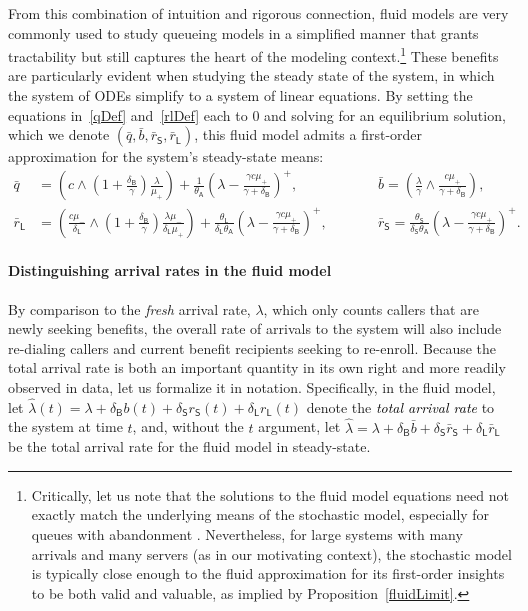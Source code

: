 \documentclass[manuscript,screen,authorversion]{acmart}
\newcommand{\rev}[1]{\textcolor{black}{#1}}
\begin{document}
From this combination of intuition and rigorous connection, fluid models are very commonly used to study queueing models in a simplified manner that grants tractability but still captures the heart of the modeling context.\footnote{Critically, let us note that the solutions to the fluid model equations need not exactly match the underlying means of the stochastic model, especially for queues with abandonment \citep[e.g.,][]{daw2019new}. Nevertheless, for large systems with many arrivals and many servers (as in our motivating context), the stochastic model is typically close enough to the fluid approximation for its first-order insights to be both valid and valuable, as implied by Proposition~\ref{fluidLimit}.} 
These benefits are particularly evident when studying the steady state of the system, in which the system of ODEs simplify to a system of linear equations.
By setting the equations in~\eqref{qDef} and~\eqref{rlDef} each to 0 and solving for an equilibrium solution, which we denote $(\bar q, \bar b, \bar r_\mathsf{S}, \bar r_\mathsf{L})$, this fluid model admits a first-order approximation for the system's steady-state means:
\begin{align}
\bar q
&=
\left(
c \wedge \left(1 + \frac{\delta_\mathsf{B}}{\gamma}\right)\frac{\lambda}{\mu_\mathsf{+}}
\right)
+
\frac{1}{\theta_\mathsf{A}}
\left(
\lambda - \frac{\gamma c \mu_{\mathsf{+}}}{\gamma + \delta_\mathsf{B}} 
\right)^+
,
\qquad
&&
\bar b 
=
\left(
\frac{\lambda}{\gamma}
\wedge
\frac{c\mu_{\mathsf{+}}}{\gamma + \delta_\mathsf{B}}
\right)
,
\\
\bar r_\mathsf{L}
&=
\left(
\frac{c\mu_{\mathsf{-}}}{\delta_\mathsf{L}}
\wedge
\left(
1 + \frac{\delta_\mathsf{B}}{\gamma}
\right)
\frac{\lambda \mu_{\mathsf{-}}}{\delta_\mathsf{L}\mu_{\mathsf{+}}}
\right)
+
\frac{\theta_\mathsf{L}}{\delta_\mathsf{L} \theta_\mathsf{A}}
\left(
\lambda - \frac{\gamma c \mu_{\mathsf{+}}}{\gamma + \delta_\mathsf{B}} 
\right)^+
,
\qquad
&&
\bar r_\mathsf{S}
=
\frac{\theta_\mathsf{S}}{\delta_\mathsf{S} \theta_\mathsf{A}}
\left(
\lambda - \frac{\gamma c \mu_{\mathsf{+}}}{\gamma + \delta_\mathsf{B}} 
\right)^+
.
\end{align}

\paragraph{Distinguishing arrival rates in the fluid model} By comparison to the \emph{fresh} arrival rate, $\lambda$, which only counts callers that are newly seeking benefits, the overall rate of arrivals to the system will also include re-dialing callers and current benefit recipients seeking to re-enroll. Because the total arrival rate is both an important quantity in its own right and more readily observed in data, let us formalize it in notation. Specifically, in the fluid model, let 
$\hat \lambda(t) 
= 
\lambda
+
\delta_\mathsf{B} b(t)
+
\delta_\mathsf{S} r_\mathsf{S}(t)
+
\delta_\mathsf{L} r_\mathsf{L}(t)$ 
denote the \rev{\emph{total arrival rate}} to the system at time $t$, and, without the $t$ argument, let 
$\hat \lambda
= 
\lambda
+
\delta_\mathsf{B} \bar{b}
+
\delta_\mathsf{S} \bar{r}_\mathsf{S}
+
\delta_\mathsf{L} \bar{r}_\mathsf{L}$ 
be the total arrival rate for the fluid model in steady-state. 
\end{document}
